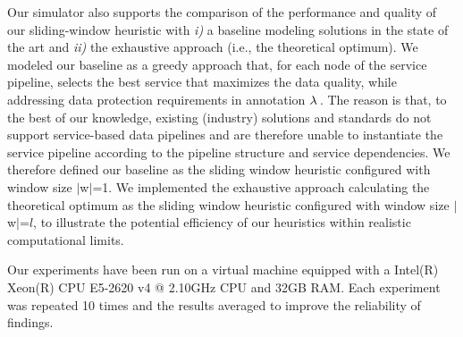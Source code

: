       {\color{OurColor}
        Our simulator also supports the comparison of the performance and quality of our sliding-window heuristic with \emph{i)} a baseline modeling solutions in the state of the art and \emph{ii)} the exhaustive approach (i.e., the theoretical optimum). We modeled our baseline as a greedy approach that, for each node of the service pipeline, selects the best service that maximizes the data quality, while addressing data protection requirements in annotation $\lambda\,$. The reason is that, to the best of our knowledge, existing (industry) solutions and standards do not support service-based data pipelines and are therefore unable to instantiate the service pipeline according to the pipeline structure and service dependencies. We therefore defined our baseline as the sliding window heuristic configured with window size $|$w$|$=1.
        We implemented the exhaustive approach calculating the theoretical optimum as the sliding window heuristic configured with window size $|$w$|$=$l$, to illustrate the potential efficiency of our heuristics within realistic computational limits.}



    Our experiments have been run on a virtual machine equipped with a Intel(R) Xeon(R) CPU E5-2620 v4 @ 2.10GHz CPU and 32GB RAM. Each experiment was repeated 10 times and the results averaged to improve the reliability of findings.

